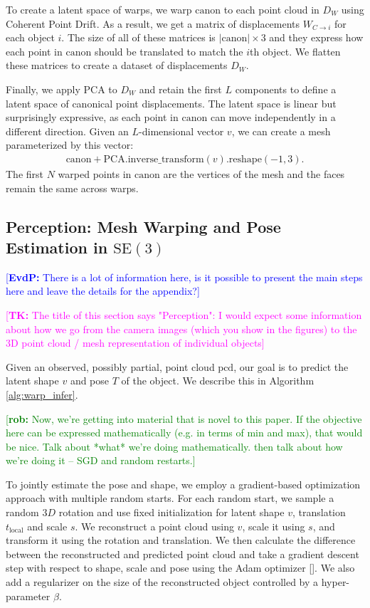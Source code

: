 \documentclass{article}
\newcommand{\evdp}[1]{\textcolor{blue}{[\textbf{EvdP:} #1]}}
\newcommand{\rob}[1]{\textcolor{green}{[\textbf{rob:} #1]}}
\newcommand{\tk}[1]{\textcolor{magenta}{[\textbf{TK:} #1]}}
\begin{document}
To create a latent space of warps, we warp $\mathrm{canon}$ to each point cloud in $D_W$ using Coherent Point Drift. As a result, we get a matrix of displacements $W_{C \rightarrow i}$ for each object $i$. The size of all of these matrices is $|\mathrm{canon}|{\times}3$ and they express how each point in $\mathrm{canon}$ should be translated to match the $i$th object. We flatten these matrices to create a dataset of displacements $D_W$.

Finally, we apply PCA to $D_W$ and retain the first $L$ components to define a latent space of canonical point displacements. The latent space is linear but surprisingly expressive, as each point in $\mathrm{canon}$ can move independently in a different direction. Given an $L$-dimensional vector $v$, we can create a mesh parameterized by this vector:
\begin{align}
    \mathrm{canon} +\mathrm{PCA.inverse\_transform}(v)\mathrm{.reshape(-1, 3)}.
\end{align}
The first $N$ warped points in $\mathrm{canon}$ are the vertices of the mesh and the faces remain the same across warps. 

\subsection{Perception: Mesh Warping and Pose Estimation in $\mathrm{SE}(3)$}
\label{sec:methods:scene}

\evdp{There is a lot of information here, is it possible to present the main steps here and leave the details for the appendix?}

\tk{The title of this section says "Perception": I would expect some information about how we go from the camera images (which you show in the figures) to the 3D point cloud / mesh representation of individual objects}

Given an observed, possibly partial, point cloud $\mathrm{pcd}$, our goal is to predict the latent shape $v$ and pose $T$ of the object. We describe this in Algorithm \ref{alg:warp_infer}.

\rob{Now, we're getting into material that is novel to this paper. If the objective here can be expressed mathematically (e.g. in terms of min and max), that would be nice. Talk about *what* we're doing mathematically. then talk about how we're doing it -- SGD and random restarts.}

To jointly estimate the pose and shape, we employ a gradient-based optimization approach with multiple random starts. For each random start, we sample a random $3D$ rotation and use fixed initialization for latent shape $v$, translation $t_{\mathrm{local}}$ and scale $s$. We reconstruct a point cloud using $v$, scale it using $s$, and transform it using the rotation and translation. We then calculate the difference between the reconstructed and predicted point cloud and take a gradient descent step with respect to shape, scale and pose using the Adam optimizer []. We also add a regularizer on the size of the reconstructed object controlled by a hyper-parameter $\beta$.
\end{document}
